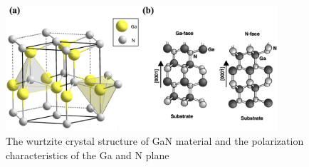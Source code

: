 \begin{figure}[H] 
\centering    
\includegraphics[width=0.9\textwidth]{ch1_7}
\caption[The wurtzite crystal structure of GaN material and the polarization characteristics of the Ga and N plane]{The wurtzite crystal structure of GaN material and the polarization characteristics of the Ga and N plane}
\label{fig:1.7}
\end{figure}

